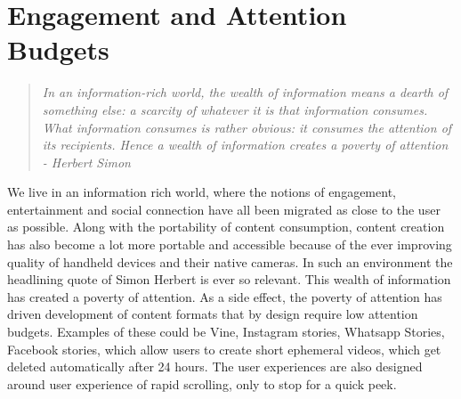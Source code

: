 
\chapter{Engagement and Attention Budgets}

\graphicspath{{Chapter2/plots/}}
\begin{quote}
    
    \textsl{In an information-rich world, the wealth of information means a  dearth of something else: a  scarcity of whatever it  is that information consumes. What information consumes is  rather obvious: it consumes the attention of its recipients. Hence a wealth of information creates a poverty of attention - Herbert Simon}\cite{simon1971designing}
    
\end{quote}
We live in an information rich world, where the notions of engagement, entertainment and social connection have all been migrated as close to the user as possible. Along with the portability of content consumption, content creation has also become a lot more portable and accessible because of the ever improving quality of handheld devices and their native cameras. In such an environment the headlining quote of Simon Herbert is ever so relevant. This wealth of information has created a poverty of attention. As a side effect, the poverty of attention has driven development of content formats that by design require low attention budgets. Examples of these could be Vine, Instagram stories, Whatsapp Stories, Facebook stories,  which allow users to create short ephemeral videos, which get deleted automatically after 24 hours. The user experiences are also designed around user experience of rapid scrolling, only to stop for a quick peek. 

